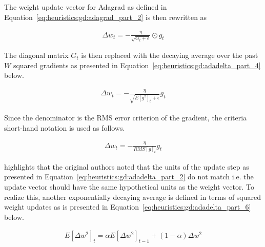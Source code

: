 The weight update vector for \ac{Adagrad} as defined in Equation~\ref{eq:heuristics:gd:adagrad_part_2} is then rewritten as


\begin{equation}
      \label{eq:heuristics:gd:adagrad_part_2_new}
      \begin{split}
            \Delta w_{t} = - \frac{\eta}{\sqrt{G_{t} + \epsilon}} \odot g_{t}
      \end{split}
\end{equation}

The diagonal matrix $G_{t}$ is then replaced with the decaying average over the past $W$ squared gradients as presented in Equation~\ref{eq:heuristics:gd:adadelta_part_4} below.

\begin{equation}
      \label{eq:heuristics:gd:adadelta_part_4}
      \begin{split}
            \Delta w_{t} = - \frac{\eta}{\sqrt{E[g^{2}]_{t} + \epsilon}} g_{t}
      \end{split}
\end{equation}

Since the denominator is the \ac{RMS} error criterion of the gradient, the criteria short-hand notation is used as follows.

\begin{equation}
      \label{eq:heuristics:gd:adadelta_part_5}
      \begin{split}
            \Delta w_{t} = - \frac{\eta}{RMS[g]_{t}} g_{t}
      \end{split}
\end{equation}

\citeauthor{ref:ruder:2016}\cite{ref:ruder:2016} highlights that the original authors \cite{ref:zeiler:2012} noted that the units of the update step as presented in Equation~\ref{eq:heuristics:gd:adadelta_part_2} do not match i.e. the update vector should have the same hypothetical units as the weight vector. To realize this, another exponentially decaying average is defined in terms of squared weight updates as is presented in Equation~\ref{eq:heuristics:gd:adadelta_part_6} below.

\begin{equation}
      \label{eq:heuristics:gd:adadelta_part_6}
      \begin{split}
            E[\Delta w^{2}]_{t} = \alpha E[\Delta w^{2}]_{t - 1} + (1 - \alpha)\Delta w^{2}
      \end{split}
\end{equation}

